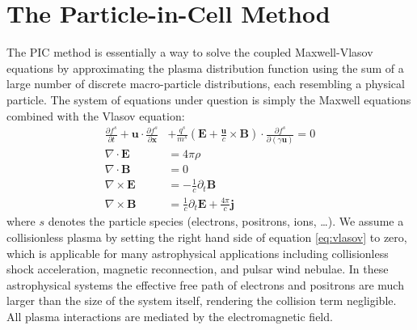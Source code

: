 \section{The Particle-in-Cell Method}
\label{sec:particle-cell-method}
The PIC method is essentially a way to solve the coupled Maxwell-Vlasov
equations by approximating the plasma distribution function using the sum of a
large number of discrete macro-particle distributions, each resembling a
physical particle. The system of equations under question is simply the Maxwell
equations combined with the Vlasov equation:
\begin{align}
  \frac{\partial f^{s}}{\partial t} + \mathbf{u}\cdot\frac{\partial f^s}{\partial \mathbf{x}} &+ \frac{q^s}{m^s}\left(\mathbf{E} + \frac{\mathbf{u}}{c}\times \mathbf{B}\right)\cdot\frac{\partial f^s}{\partial (\gamma \mathbf{u})} = 0 \label{eq:vlasov}\\
  \nabla\cdot \mathbf{E} &= 4\pi\rho \\
  \nabla\cdot \mathbf{B} &= 0 \\
  \nabla\times \mathbf{E} &= -\frac{1}{c}\partial_t \mathbf{B} \\
  \nabla\times \mathbf{B} &= \frac{1}{c}\partial_t \mathbf{E} + \frac{4\pi}{c} \mathbf{j}
\end{align}
where $s$ denotes the particle species (electrons, positrons, ions,
\dots). We assume a collisionless plasma by setting the right hand
side of equation \eqref{eq:vlasov} to zero, which is applicable for many
astrophysical applications including collisionless shock acceleration,
magnetic reconnection, and pulsar wind nebulae. In these astrophysical systems
the effective free path of electrons and positrons are much larger than the
size of the system itself, rendering the collision term negligible. All plasma
interactions are mediated by the electromagnetic field.

